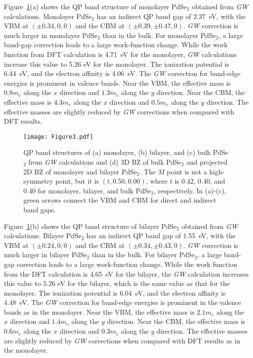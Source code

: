 \documentclass[aps,prb,longbibliography,twocolumn]{revtex4-2}
\begin{document}
Figure~\ref{fig3pdse2}(a) shows the QP band structure of monolayer PdSe$_2$ obtained from
{\em GW} calculations.
Monolayer PdSe$_2$ has an indirect QP band gap of 2.37~eV,
with the VBM at $(\pm0.34,0,0)$ and the CBM at $(\pm0.39,\pm0.47,0)$.
{\em GW} correction is much larger in monolayer PdSe$_2$ than in the bulk.
For monolayer PdSe$_2$, a large band-gap 
correction leads to a large work-function change. 
While the work function from DFT calculation is 4.71~eV for 
the monolayer, {\em GW} calculations increase this value to 5.26 eV 
for the monolayer.
The ionization potential is 6.44~eV, and the electron affinity is 4.06~eV. 
The {\em GW} correction for band-edge energies is prominent in valence bands.
Near the VBM, the effective mass is $0.8m_e$ along the $x$ direction
and $1.3m_e$ along the $y$ direction. 
Near the CBM, the effective mass is $4.3m_e$ along the $x$ direction
and $0.5m_e$ along the $y$ direction. The effective masses are slightly reduced by {\em GW} corrections when compared with DFT results.


\begin{figure}
\texttt{[image: Figure3.pdf]}
\caption{\label{fig3pdse2}QP band structures of (a) monolayer, (b) bilayer, 
and (c) bulk PdSe$_2$ from {\em GW} calculations and (d) 3D BZ of bulk PdSe$_2$ and 
projected 2D BZ of monolayer and bilayer PdSe$_2$. 
The $M$ point is not a high-symmetry point, but it is $(t, 0.50, 0.00)$, where $t$ is $0.42$, $0.40$, and $0.40$ for monolayer, bilayer, and bulk PdSe$_2$, respectively. 
In (a)-(c), green arrows connect the VBM and CBM for direct and indirect band gaps.}
\end{figure}


Figure~\ref{fig3pdse2}(b) shows the QP band structure of bilayer PdSe$_2$ obtained from 
{\em GW} calculations.
Bilayer PdSe$_2$ has an indirect QP band gap of 1.55~eV,
with the VBM at $(\pm0.24,0,0)$ and the CBM at $(\pm0.34,\pm0.43,0)$.
{\em GW} correction is much larger in bilayer PdSe$_2$ than in the bulk.
For bilayer PdSe$_2$, a large band-gap 
correction leads to a large work-function change. 
While the work function from the DFT calculation is 4.65~eV for the bilayer, 
the {\em GW} calculation increases this value to 5.26 eV for the bilayer, 
which is the same value as that for the monolayer.
The ionization potential is 6.04~eV, and the electron affinity is 4.48~eV. 
The {\em GW} correction for band-edge energies is prominent in the valence bands as in the monolayer.
Near the VBM, the effective mass is $2.1m_e$ along the $x$ direction
and $1.4m_e$ along the $y$ direction. 
Near the CBM, the effective mass is $0.6m_e$ along the $x$ direction
and $0.3m_e$ along the $y$ direction. The effective masses are slightly reduced by {\em GW} corrections when compared with DFT results as in the monolayer.
\end{document}
